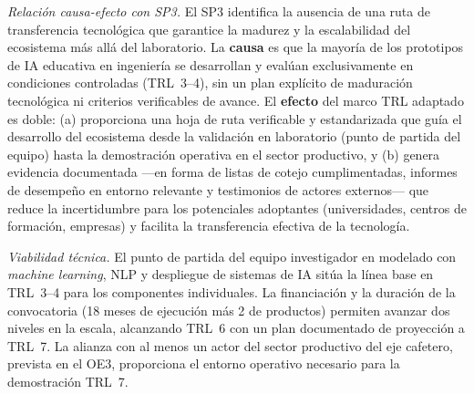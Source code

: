 \emph{Relación causa-efecto con SP3.}
El SP3 identifica la ausencia de una ruta de transferencia tecnológica que garantice
la madurez y la escalabilidad del ecosistema más allá del laboratorio. La
\textbf{causa} es que la mayoría de los prototipos de IA educativa en ingeniería se
desarrollan y evalúan exclusivamente en condiciones controladas (TRL~3--4), sin un
plan explícito de maduración tecnológica ni criterios verificables de avance. El
\textbf{efecto} del marco TRL adaptado es doble: (a) proporciona una hoja de ruta
verificable y estandarizada que guía el desarrollo del ecosistema desde la validación
en laboratorio (punto de partida del equipo) hasta la demostración operativa en el
sector productivo, y (b) genera evidencia documentada —en forma de listas de cotejo
cumplimentadas, informes de desempeño en entorno relevante y testimonios de actores
externos— que reduce la incertidumbre para los potenciales adoptantes (universidades,
centros de formación, empresas) y facilita la transferencia efectiva de la
tecnología.

\emph{Viabilidad técnica.}
El punto de partida del equipo investigador en modelado con \emph{machine learning},
NLP y despliegue de sistemas de IA \cite{escamilla2022artificial} sitúa la línea base
en TRL~3--4 para los componentes individuales. La financiación y la duración de la
convocatoria (18 meses de ejecución más 2 de productos) permiten avanzar dos niveles
en la escala, alcanzando TRL~6 con un plan documentado de proyección a TRL~7. La
alianza con al menos un actor del sector productivo del eje cafetero, prevista en el
OE3, proporciona el entorno operativo necesario para la demostración TRL~7.

